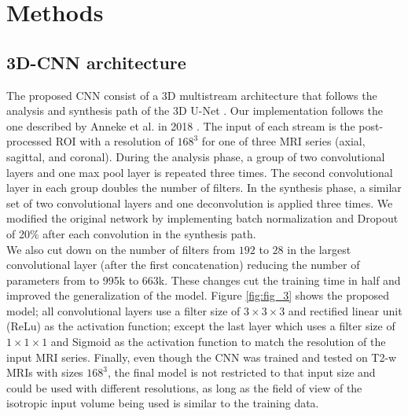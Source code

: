 \section{Methods}
\label{sec:methods}




\subsection{3D-CNN architecture}
The proposed CNN consist of a 3D multistream architecture that follows the analysis and synthesis path of the 3D U-Net \cite{cciccek20163d}. Our implementation follows the one described by Anneke et al. in 2018  \cite{anneke}. The input of each stream is the post-processed ROI with a resolution of $168^3$ for one of three MRI series (axial, sagittal, and coronal). During the analysis phase, a group of two convolutional layers and one max pool layer is repeated three times. The second convolutional layer in each group doubles the number of filters.  In the synthesis phase, a similar set of two convolutional layers and one deconvolution is applied three times. We modified the original network by implementing batch normalization \cite{ioffe2015batch} and Dropout of 20\%  \cite{hinton2012improving} after each convolution in the synthesis path.\\
We also cut down on the number of filters from $192$ to $28$ in the largest convolutional layer (after the first concatenation) reducing the number of parameters from to 995k to 663k. These changes cut the training time in half and improved the generalization of the  model. Figure \ref{fig:fig_3} shows the proposed model; all convolutional layers use a filter size of $3 \times 3 \times 3$ and rectified linear unit (ReLu) as the activation function; except the last layer which uses a filter size of $1 \times 1 \times 1$ and Sigmoid as the activation function to match the resolution of the input MRI series.
Finally, even though the CNN was trained and tested on T2-w MRIs with sizes $168^3$, the final model is not restricted to that input size and could be used with different resolutions, as long as the field of view of the isotropic input volume being used is similar to the training data. 

